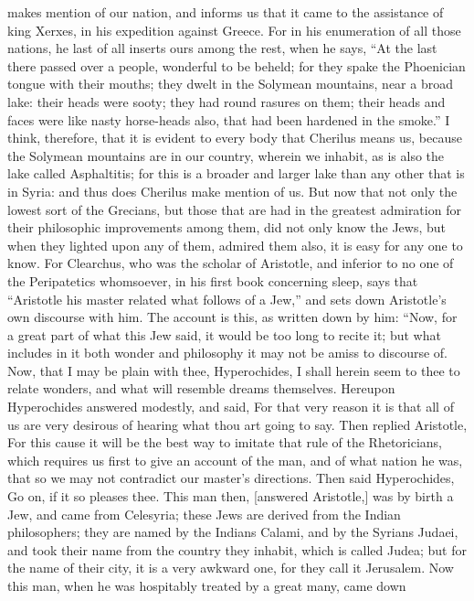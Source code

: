 makes mention of our nation, and informs us that it came to the assistance
of king Xerxes, in his expedition against Greece. For in his enumeration
of all those nations, he last of all inserts ours among the rest, when he
says, ``At the last there passed over a people, wonderful to be beheld; for
they spake the Phoenician tongue with their mouths; they dwelt in the
Solymean mountains, near a broad lake: their heads were sooty; they had
round rasures on them; their heads and faces were like nasty horse-heads
also, that had been hardened in the smoke.'' I think, therefore, that it is
evident to every body that Cherilus means us, because the Solymean
mountains are in our country, wherein we inhabit, as is also the lake
called Asphaltitis; for this is a broader and larger lake than any other
that is in Syria: and thus does Cherilus make mention of us. But now that
not only the lowest sort of the Grecians, but those that are had in the
greatest admiration for their philosophic improvements among them, did not
only know the Jews, but when they lighted upon any of them, admired them
also, it is easy for any one to know. For Clearchus, who was the scholar
of Aristotle, and inferior to no one of the Peripatetics whomsoever, in
his first book concerning sleep, says that ``Aristotle his master related
what follows of a Jew,'' and sets down Aristotle's own discourse with him.
The account is this, as written down by him: ``Now, for a great part of
what this Jew said, it would be too long to recite it; but what includes
in it both wonder and philosophy it may not be amiss to discourse of. Now,
that I may be plain with thee, Hyperochides, I shall herein seem to thee
to relate wonders, and what will resemble dreams themselves. Hereupon
Hyperochides answered modestly, and said, For that very reason it is that
all of us are very desirous of hearing what thou art going to say. Then
replied Aristotle, For this cause it will be the best way to imitate that
rule of the Rhetoricians, which requires us first to give an account of
the man, and of what nation he was, that so we may not contradict our
master's directions. Then said Hyperochides, Go on, if it so pleases thee.
This man then, [answered Aristotle,] was by birth a Jew, and came from
Celesyria; these Jews are derived from the Indian philosophers; they are
named by the Indians Calami, and by the Syrians Judaei, and took their
name from the country they inhabit, which is called Judea; but for the
name of their city, it is a very awkward one, for they call it Jerusalem.
Now this man, when he was hospitably treated by a great many, came down
